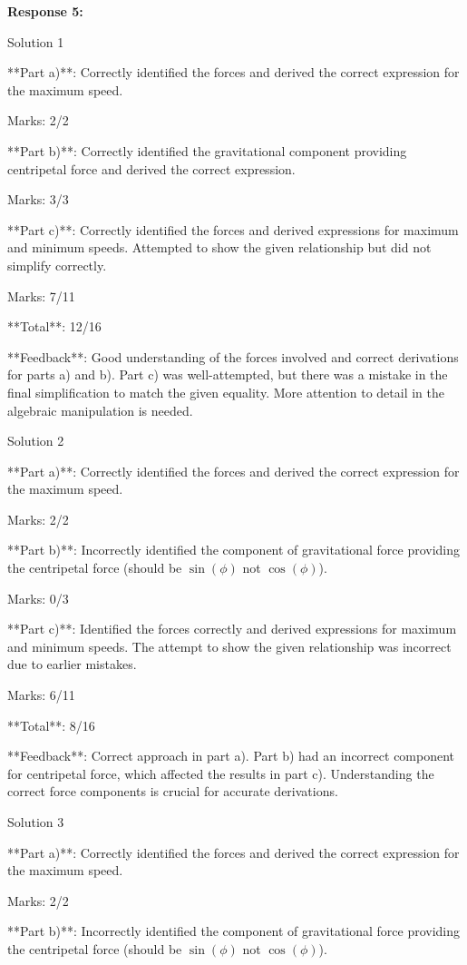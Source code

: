 \documentclass[a4paper,11pt]{article}
\begin{document}
\bigskip
\textbf{Response 5:}

Solution 1

**Part a)**: 
Correctly identified the forces and derived the correct expression for the maximum speed.

Marks: 2/2

**Part b)**: 
Correctly identified the gravitational component providing centripetal force and derived the correct expression.

Marks: 3/3

**Part c)**: 
Correctly identified the forces and derived expressions for maximum and minimum speeds. Attempted to show the given relationship but did not simplify correctly.

Marks: 7/11

**Total**: 12/16

**Feedback**: Good understanding of the forces involved and correct derivations for parts a) and b). Part c) was well-attempted, but there was a mistake in the final simplification to match the given equality. More attention to detail in the algebraic manipulation is needed.

Solution 2

**Part a)**: 
Correctly identified the forces and derived the correct expression for the maximum speed.

Marks: 2/2

**Part b)**: 
Incorrectly identified the component of gravitational force providing the centripetal force (should be \(\sin(\phi)\) not \(\cos(\phi)\)).

Marks: 0/3

**Part c)**: 
Identified the forces correctly and derived expressions for maximum and minimum speeds. The attempt to show the given relationship was incorrect due to earlier mistakes.

Marks: 6/11

**Total**: 8/16

**Feedback**: Correct approach in part a). Part b) had an incorrect component for centripetal force, which affected the results in part c). Understanding the correct force components is crucial for accurate derivations.

Solution 3

**Part a)**: 
Correctly identified the forces and derived the correct expression for the maximum speed.

Marks: 2/2

**Part b)**: 
Incorrectly identified the component of gravitational force providing the centripetal force (should be \(\sin(\phi)\) not \(\cos(\phi)\)).
\end{document}
